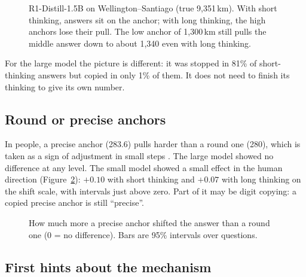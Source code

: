 \documentclass[11pt,a4paper]{article}
\begin{document}
\begin{figure}[ht]
\centering{}
\caption{R1-Distill-1.5B on Wellington--Santiago (true 9,351\,km). With short thinking, answers sit on the anchor; with long thinking, the high anchors lose their pull. The low anchor of 1,300\,km still pulls the middle answer down to about 1,340 even with long thinking.}
\label{fig:wellington}
\end{figure}

For the large model the picture is different: it was stopped in 81\% of short-thinking answers but copied in only 1\% of them. It does not need to finish its thinking to give its own number.

\subsection{Round or precise anchors}

In people, a precise anchor (283.6) pulls harder than a round one (280), which is taken as a sign of adjustment in small steps \citep{janiszewski2008precision}. The large model showed no difference at any level. The small model showed a small effect in the human direction (Figure~\ref{fig:precision}): $+0.10$ with short thinking and $+0.07$ with long thinking on the shift scale, with intervals just above zero. Part of it may be digit copying: a copied precise anchor is still \enquote{precise}.

\begin{figure}[ht]
\centering{}
\caption{How much more a precise anchor shifted the answer than a round one (0 = no difference). Bars are 95\% intervals over questions.}
\label{fig:precision}
\end{figure}

\subsection{First hints about the mechanism}
\end{document}
